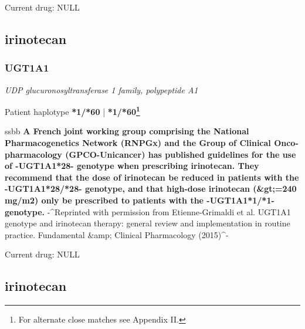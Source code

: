 \documentclass{book}
\begin{document}
      

    

      Current drug: NULL

      \subsection{ irinotecan }
        \subsubsection{ UGT1A1 }
      \textit{ UDP glucuronosyltransferase 1 family, polypeptide A1 }
      \begin{center}
      Patient haplotype
      \textbf{ *1/*60 } | \textbf{ *1/*60\footnote{For alternate close matches see Appendix II.} } \newline\newline
      \scriptsize
      \begin{tabularx}{\textwidth}{ssbb}
      \textbf{ A French joint working group comprising the National Pharmacogenetics Network (RNPGx) and the Group of Clinical Onco-pharmacology (GPCO-Unicancer) has published guidelines for the use of -UGT1A1*28- genotype when prescribing irinotecan. They recommend that the dose of irinotecan be reduced in patients with the -UGT1A1*28/*28- genotype, and that high-dose irinotecan (&gt;=240 mg/m2) only be prescribed to patients with the -UGT1A1*1/*1- genotype. }
      -^Reprinted with permission from Etienne-Grimaldi et al. UGT1A1 genotype and irinotecan therapy: general review and implementation in routine practice. Fundamental &amp; Clinical Pharmacology (2015)^-\\
      \end{tabularx}
      \end{center}

      

    

      Current drug: NULL

      \subsection{ irinotecan }
\end{document}
